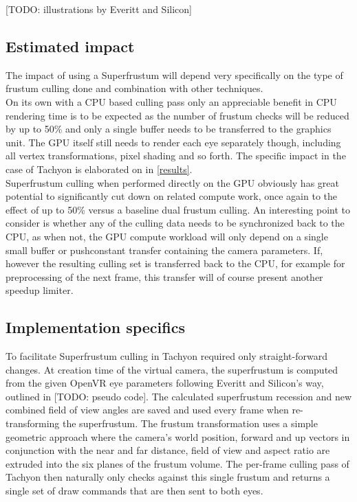 {[TODO: illustrations by Everitt and Silicon]

\subsection{Estimated impact}
The impact of using a Superfrustum will depend very specifically on the type of frustum culling done and combination with other techniques. \\
On its own with a CPU based culling pass only an appreciable benefit in CPU rendering time is to be expected as the number of frustum checks will be reduced by up to 50\% and only a single buffer needs to be transferred to the graphics unit. The GPU itself still needs to render each eye separately though, including all vertex transformations, pixel shading and so forth. The specific impact in the case of Tachyon is elaborated on in \autoref{results}. \\
Superfrustum culling when performed directly on the GPU obviously has great potential to significantly cut down on related compute work, once again to the effect of up to 50\% versus a baseline dual frustum culling. An interesting point to consider is whether any of the culling data needs to be synchronized back to the CPU, as when not, the GPU compute workload will only depend on a single small buffer or pushconstant transfer containing the camera parameters. If, however the resulting culling set is transferred back to the CPU, for example for preprocessing of the next frame, this transfer will of course present another speedup limiter. 

\subsection{Implementation specifics}
To facilitate Superfrustum culling in Tachyon required only straight-forward changes. At creation time of the virtual camera, the superfrustum is computed from the given OpenVR eye parameters following Everitt and Silicon's way, outlined in [TODO: pseudo code]. 
The calculated superfrustum recession and new combined field of view angles are saved and used every frame when re-transforming the superfrustum. The frustum transformation uses a simple geometric approach where the camera's world position, forward and up vectors in conjunction with the near and far distance, field of view and aspect ratio are extruded into the six planes of the frustum volume. 
The per-frame culling pass of Tachyon then naturally only checks against this single frustum and returns a single set of draw commands that are then sent to both eyes. 



}

